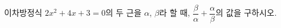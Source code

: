 이차방정식 $2x^2+4x+3=0$의 두 근을 $\alpha$, $\beta$라 할 때, $\dfrac{\beta}{\alpha}+\dfrac{\alpha}{\beta}$의 값을 구하시오.
